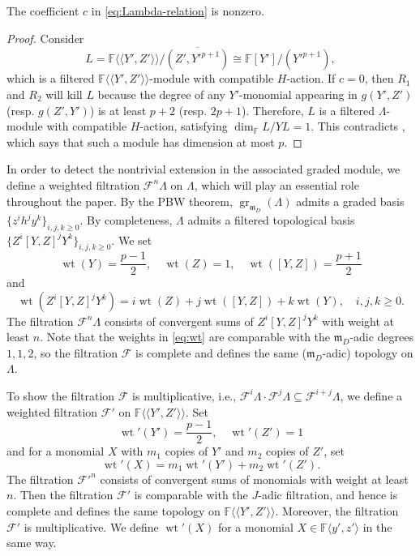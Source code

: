 \documentclass[11pt,a4paper]{article} %
\def\FF{\mathbb{F}}
\def\cF{\mathcal{F}}
\def\dim{\operatorname{dim}}
\def\gr{\operatorname{gr}}
\def\wet{\operatorname{wt}}
\begin{document}
\begin{lemma}\label{lem:c-nonzero}
The coefficient $c$ in \eqref{eq:Lambda-relation} is nonzero.
\end{lemma}

\begin{proof}
    Consider 
    \[
    L=\FF\langle\langle Y',Z'\rangle\rangle/\overline{(Z',{Y'}^{p+1})}\cong\FF[Y']/({Y'}^{p+1}),
    \]
    which is a filtered $\FF\langle\langle Y',Z'\rangle\rangle$-module with compatible $H$-action. If $c=0$, then $R_1$ and $R_2$ will kill $L$ because the degree of any $Y'$-monomial appearing in $g(Y',Z')$ (resp. $g(Z',Y')$) is at least $p+2$ (resp. $2p+1$). Therefore, $L$ is a filtered $\Lambda$-module with compatible $H$-action, satisfying $\dim_{\FF}L/YL=1$. This contradicts \cite[Proposition 2.21]{HW24a}, which says that such a module has dimension at most $p$.
\end{proof}

In order to detect the nontrivial extension in the associated graded module, we define a weighted filtration $\cF^n\Lambda$ on $\Lambda$, which will play an essential role throughout the paper. By the PBW theorem, $\gr_{\mathfrak{m}_D}(\Lambda)$ admits a graded basis $\{z^ih^jy^k\}_{i,j,k\ge0}$. By completeness, $\Lambda$ admits a filtered topological basis $\{Z^i[Y,Z]^jY^k\}_{i,j,k\ge0}$. We set 
\begin{equation}\label{eq:wt}
\wet(Y)=\frac{p-1}{2},\quad\wet(Z)=1,\quad\wet([Y,Z])=\frac{p+1}{2}
\end{equation}
and 
\[
\wet(Z^i[Y,Z]^jY^k)=i\wet(Z)+j\wet([Y,Z])+k\wet(Y),\quad i,j,k\ge0.
\]
The filtration $\cF^n\Lambda$ consists of convergent sums of $Z^i[Y,Z]^jY^k$ with weight at least $n$. Note that the weights in \eqref{eq:wt} are comparable with the $\mathfrak{m}_D$-adic degrees $1,1,2$, so the filtration $\cF$ is complete and defines the same ($\mathfrak{m}_D$-adic) topology on $\Lambda$. 

To show the filtration $\cF$ is multiplicative, i.e., $\cF^i\Lambda\cdot\cF^j\Lambda\subseteq\cF^{i+j}\Lambda$, we define a weighted filtration $\cF'$ on $\FF\langle\langle Y',Z'\rangle\rangle$. Set 
\[
\wet'(Y')=\frac{p-1}{2},\quad\wet'(Z')=1
\]
and for a monomial $X$ with $m_1$ copies of $Y'$ and $m_2$ copies of $Z'$, set 
\[
\wet
'(X)=m_1\wet'(Y')+m_2\wet'(Z').
\]
The filtration ${\cF'}^n$ consists of convergent sums of monomials with weight at least $n$. Then the filtration $\cF'$ is comparable with the $J$-adic filtration, and hence is complete and defines the same topology on $\FF\langle\langle Y',Z'\rangle\rangle$. Moreover, the filtration $\cF'$ is multiplicative. We define $\wet'(X)$ for a monomial $X\in\FF\langle y',z'\rangle$ in the same way.
\end{document}
